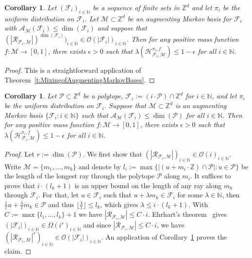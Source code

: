 \documentclass[11pt]{amsart}
\newtheorem{cor}[thm]{Corollary}
\theoremstyle{definition}
\numberwithin{equation}{section}
\newcommand{\ring}[1]{\ensuremath{\mathbb{#1}}}
\renewcommand{\>}{\rangle}
\newcommand{\<}{\langle}
\newcommand{\0}{\mathbf{0}}
\newcommand{\1}{\mathbf{1}}
\newcommand{\2}{\mathbf{2}}
\newcommand\NN{\ring{N}}
\newcommand\ZZ{\ring{Z}}
\newcommand\cA{{\mathcal A}}
\newcommand\cF{{\mathcal F}}
\newcommand\cM{{\mathcal M}}
\newcommand\cP{{\mathcal P}}
\newcommand{\longestRay}[2]{\mathcal{R}_{#1,#2}}
\newcommand{\heatbath}[4]{\mathcal{H}^{#1,#2}_{#3,#4}}
\newcommand{\auglen}[2]{\cA_{#1}(#2)}
\begin{document}
\begin{cor}\label{c:AugmentingExpander}
Let $(\cF_i)_{i\in\NN}$ be a sequence of finite sets in $\ZZ^d$ and let
$\pi_i$ be the uniform distribution on $\cF_i$. Let $\cM\subset\ZZ^d$ be
an augmenting Markov basis for $\cF_i$ with $\auglen{\cM}{\cF_i}\le\dim(\cF_i)$
and suppose that
$(|\longestRay{\cF_i}{\cM}|)^{\dim(\cF_i)})_{i\in\NN}\in\mathcal{O}(|\cF_i|)_{i\in\NN}$.
Then for any positive mass function $f:\cM\to[0,1]$, there exists $\epsilon>0$ such that
$\lambda(\heatbath{\pi_i}{f}{\cF_i}{\cM})\le 1-\epsilon$ for all
$i\in\NN$.
\end{cor}
\begin{proof}
This is a straightforward application of
Theorem~\ref{t:MixingofAugmentingMarkovBases}. 
\end{proof}

\begin{cor}\label{c:ExpanderDilatation}
Let $\cP\subset\ZZ^d$ be a polytope, $\cF_i:=(i\cdot\cP)\cap\ZZ^d$
for $i\in\NN$, and let $\pi_i$ be the uniform distribution on $\cF_i$.
Suppose that $\cM\subset\ZZ^d$ is an augmenting Markov basis
$\{\cF_i:i\in\NN\}$ such that $\auglen{\cM}{\cF_i}\le\dim(\cP)$ for
all $i\in\NN$. 
Then for any positive mass function $f:\cM\to[0,1]$, there exists
$\epsilon>0$ such that $\lambda(\heatbath{\pi_i}{f}{\cF_i}{\cM})\le
1-\epsilon$ for all $i\in\NN$.
\end{cor}
\begin{proof}
Let $r:=\dim(\cP)$. We first show that
$(|\longestRay{\cF_i}{\cM}|)_{i\in\NN}\in\mathcal{O}(i)_{i\in\NN}$.
Write $\cM=\{m_1,\dots,m_k\}$ and denote by
$l_i:=\max\{|(u+m_i\cdot\ZZ)\cap\cP|: u\in\cP\}$ be the length of the
longest ray through the polytope $\cP$ along $m_i$.  It suffices to
prove that $i\cdot(l_k+1)$ is an upper bound on the length of any ray
along $m_k$ through $\cF_i$. For that, let $u\in\cF_i$ such that
$u+\lambda m_k\in\cF_i$ for some $\lambda\in\NN$, then
$\frac{1}{i}u+\frac{\lambda}{i} m_k\in\cP$ and thus
$\lfloor\frac{\lambda}{i}\rfloor\le l_k$, which gives $\lambda\le
i\cdot(l_k+1)$. With $C:=\max\{l_1,\dots,l_k\}+1$ we have
$|\longestRay{\cF_i}{\cM}|\le C\cdot i$.
Ehrhart's theorem~\cite[Theorem~3.23]{Beck2007} gives
$(|\cF_i|)_{i\in\NN}\in\Omega(i^r)_{i\in\NN}$ and
since $|\longestRay{\cF_i}{\cM}|\le C\cdot i$, we have
$(|\longestRay{\cF_i}{\cM}|^r)_{i\in\NN}\in\mathcal{O}(|\cF_i|)_{i\in\NN}$.
An application of Corollary~\ref{c:AugmentingExpander} proves the claim.
\end{proof}
\end{document}
